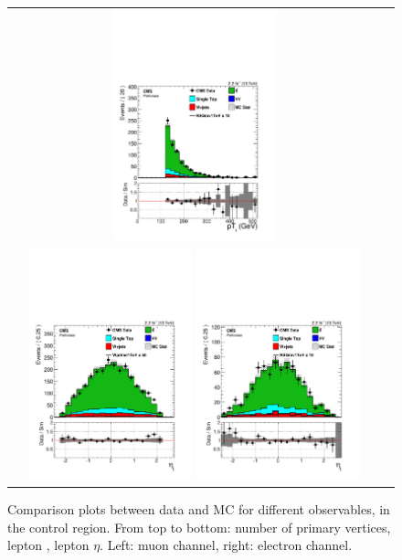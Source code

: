 \begin{figure}[htbp]
\begin{tabular}{cc}
 \includegraphics[width=0.45\textwidth]{chapters/Chapter8-EventSelection/Figures/WVanalysis/ControlPlots_TTbar/el/l_pt_0}\\
 \includegraphics[width=0.45\textwidth]{chapters/Chapter8-EventSelection/Figures/WVanalysis/ControlPlots_TTbar/mu/l_eta_0}
 \includegraphics[width=0.45\textwidth]{chapters/Chapter8-EventSelection/Figures/WVanalysis/ControlPlots_TTbar/el/l_eta_0}\\
 \end{tabular}
 \caption{Comparison plots between data and MC for different observables, in the \ttbar control region.
 From top to bottom: number of primary vertices, lepton \pt, lepton $\eta$. 
 Left: muon channel, right: electron channel. }
 \label{fig:TTbar_controlPlots_1}
 \end{figure}

